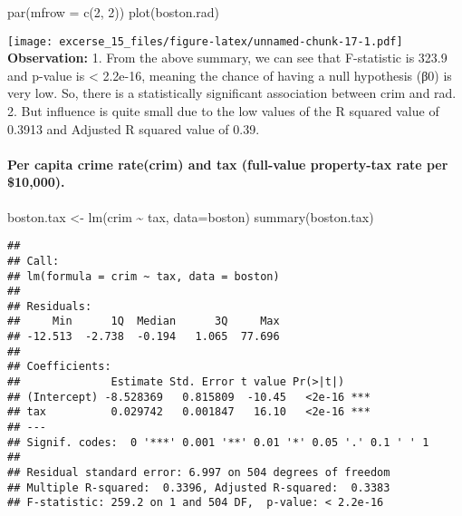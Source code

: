 \documentclass[
]{article}
\newenvironment{Shaded}{\begin{snugshade}}{\end{snugshade}}
\newcommand{\AttributeTok}[1]{\textcolor[rgb]{0.77,0.63,0.00}{#1}}
\newcommand{\DecValTok}[1]{\textcolor[rgb]{0.00,0.00,0.81}{#1}}
\newcommand{\FunctionTok}[1]{\textcolor[rgb]{0.00,0.00,0.00}{#1}}
\newcommand{\NormalTok}[1]{#1}
\newcommand{\OtherTok}[1]{\textcolor[rgb]{0.56,0.35,0.01}{#1}}
\newcommand{\SpecialCharTok}[1]{\textcolor[rgb]{0.00,0.00,0.00}{#1}}
\begin{document}
\begin{Shaded}
\begin{Highlighting}[]
\FunctionTok{par}\NormalTok{(}\AttributeTok{mfrow =} \FunctionTok{c}\NormalTok{(}\DecValTok{2}\NormalTok{, }\DecValTok{2}\NormalTok{))}
\FunctionTok{plot}\NormalTok{(boston.rad)}
\end{Highlighting}
\end{Shaded}

\texttt{[image: excerse\_15\_files/figure-latex/unnamed-chunk-17-1.pdf]}
\textbf{Observation:} 1. From the above summary, we can see that
F-statistic is 323.9 and p-value is \textless{} 2.2e-16, meaning the
chance of having a null hypothesis (β0) is very low. So, there is a
statistically significant association between crim and rad. 2. But
influence is quite small due to the low values of the R squared value of
0.3913 and Adjusted R squared value of 0.39.

\hypertarget{per-capita-crime-ratecrim-and-tax-full-value-property-tax-rate-per-10000.}{%
\paragraph{Per capita crime rate(crim) and tax (full-value property-tax
rate per
\$10,000).}\label{per-capita-crime-ratecrim-and-tax-full-value-property-tax-rate-per-10000.}}

\begin{Shaded}
\begin{Highlighting}[]
\NormalTok{boston.tax }\OtherTok{\textless{}{-}} \FunctionTok{lm}\NormalTok{(crim }\SpecialCharTok{\textasciitilde{}}\NormalTok{ tax, }\AttributeTok{data=}\NormalTok{boston)}
\FunctionTok{summary}\NormalTok{(boston.tax)}
\end{Highlighting}
\end{Shaded}

\begin{verbatim}
## 
## Call:
## lm(formula = crim ~ tax, data = boston)
## 
## Residuals:
##     Min      1Q  Median      3Q     Max 
## -12.513  -2.738  -0.194   1.065  77.696 
## 
## Coefficients:
##              Estimate Std. Error t value Pr(>|t|)    
## (Intercept) -8.528369   0.815809  -10.45   <2e-16 ***
## tax          0.029742   0.001847   16.10   <2e-16 ***
## ---
## Signif. codes:  0 '***' 0.001 '**' 0.01 '*' 0.05 '.' 0.1 ' ' 1
## 
## Residual standard error: 6.997 on 504 degrees of freedom
## Multiple R-squared:  0.3396, Adjusted R-squared:  0.3383 
## F-statistic: 259.2 on 1 and 504 DF,  p-value: < 2.2e-16
\end{verbatim}
\end{document}
